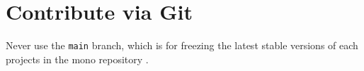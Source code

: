 \documentclass{tutodoc}
\begin{document}
\section{Contribute via Git}

\begin{tdoccaut}
    Never use the \verb#main# branch, which is for freezing the latest stable versions of each projects in the mono repository \thismonorepo.
\end{tdoccaut}
\end{document}
